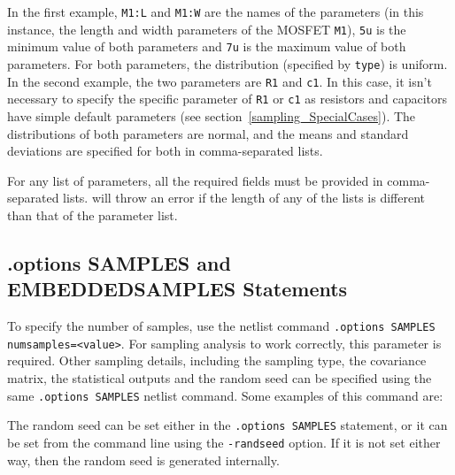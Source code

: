 In the first example, \verb|M1:L| and \verb|M1:W| 
are the names of the
parameters (in this instance, the length and width parameters of the MOSFET
\texttt{M1}), \verb|5u| is the minimum value of both parameters and
\verb|7u| is the maximum value of both parameters.  For both parameters, 
the distribution (specified by \texttt{type}) is uniform.
In the second example, the two parameters are \verb|R1| and \verb|c1|.   In this 
case, it isn't necessary to specify the specific parameter of \verb|R1| or \verb|c1| 
as resistors and capacitors have simple default parameters (see section~\ref{sampling_SpecialCases}).  
The distributions of both parameters are normal, and the means and standard deviations 
are specified for both in comma-separated lists.

For any list of parameters, all the required fields must be provided in comma-separated 
lists.  \Xyce{} will throw an error if the length of any of the lists is different 
than that of the parameter list.

\subsection{.options SAMPLES and EMBEDDEDSAMPLES Statements}
\label{options_samples_statement}

To specify the number of samples, use the netlist command \texttt{.options 
SAMPLES numsamples=<value>}.   For sampling analysis to work correctly, this parameter is required.
Other sampling details, including the sampling type, the covariance matrix, 
the statistical outputs and the random seed can be specified using the 
same \verb|.options SAMPLES| netlist command.  Some examples of this command are:

The random seed can be set either in the \texttt{.options SAMPLES} statement, or 
it can be set from the command line using the \texttt{-randseed} option.  If it 
is not set either way, then the random seed is generated internally.

